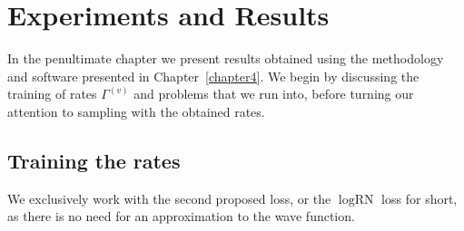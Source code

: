 \ifpdf
\graphicspath{{Chapter5/Figs/Raster/}{Chapter5/Figs/PDF/}{Chapter5/Figs/}}
\else
\graphicspath{{Chapter5/Figs/Vector/}{Chapter5/Figs/}}
\fi


\chapter{Experiments and Results}
\label{chapter5}
In the penultimate chapter we present results obtained using the methodology and software presented in Chapter~\ref{chapter4}. We begin by discussing the training of rates $\Gamma^{(v)}$ and problems that we run into, before turning our attention to sampling with the obtained rates.  

\section{Training the rates}
We exclusively work with the second proposed loss, or the $\log \text{RN}$ loss for short, as there is no need for an approximation to the wave function.



